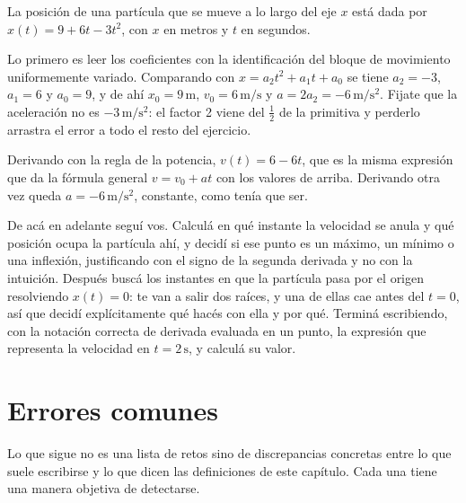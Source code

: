 \documentclass[11pt,openany]{book}
\begin{document}
\begin{ejemplo}[parcial]
La posición de una partícula que se mueve a lo largo del eje $x$ está dada por $x(t) = 9 + 6t - 3t^2$, con $x$ en metros y $t$ en segundos.

Lo primero es leer los coeficientes con la identificación del bloque de movimiento uniformemente variado. Comparando con $x = a_2t^2 + a_1t + a_0$ se tiene $a_2 = -3$, $a_1 = 6$ y $a_0 = 9$, y de ahí $x_0 = 9\,\mathrm{m}$, $v_0 = 6\,\mathrm{m/s}$ y $a = 2a_2 = -6\,\mathrm{m/s^2}$. Fijate que la aceleración no es $-3\,\mathrm{m/s^2}$: el factor 2 viene del $\tfrac12$ de la primitiva y perderlo arrastra el error a todo el resto del ejercicio.

Derivando con la regla de la potencia, $v(t) = 6 - 6t$, que es la misma expresión que da la fórmula general $v = v_0 + at$ con los valores de arriba. Derivando otra vez queda $a = -6\,\mathrm{m/s^2}$, constante, como tenía que ser.

De acá en adelante seguí vos. Calculá en qué instante la velocidad se anula y qué posición ocupa la partícula ahí, y decidí si ese punto es un máximo, un mínimo o una inflexión, justificando con el signo de la segunda derivada y no con la intuición. Después buscá los instantes en que la partícula pasa por el origen resolviendo $x(t)=0$: te van a salir dos raíces, y una de ellas cae antes del $t=0$, así que decidí explícitamente qué hacés con ella y por qué. Terminá escribiendo, con la notación correcta de derivada evaluada en un punto, la expresión que representa la velocidad en $t=2\,\mathrm{s}$, y calculá su valor.
\end{ejemplo}

\section{Errores comunes}

Lo que sigue no es una lista de retos sino de discrepancias concretas entre lo que suele escribirse y lo que dicen las definiciones de este capítulo. Cada una tiene una manera objetiva de detectarse.
\end{document}
